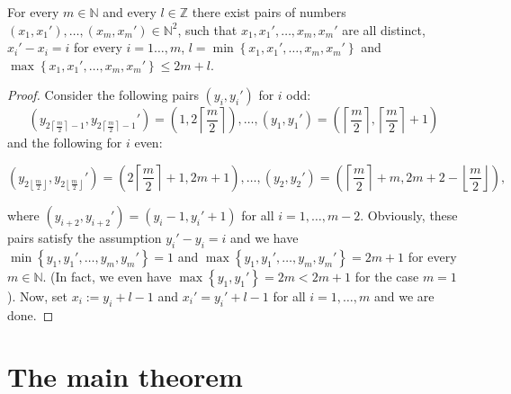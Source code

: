 \begin{lem}\label{lemma15}
For every \(m\in\mathbb{N}\) and every \(l\in\mathbb{Z}\) there exist pairs of numbers\\
\((x_1,x_1'),\ldots,(x_m,x_m')\in\mathbb{N}^2\), such that \(x_1,x_1',\ldots,x_m,x_m'\) are all distinct,\\
\(x_i'-x_i=i\) for every \(i=1\ldots,m\), \(l=\min\left\{x_1,x_1',\ldots,x_m,x_m'\right\}\) and\\
\(\max\left\{x_1,x_1',\ldots,x_m,x_m'\right\}\leq 2m+l\).
\begin{proof}
Consider the following pairs \((y_i,y_i')\) for \(i\) odd:
\[
\left(y_{2\left\lceil\frac{m}{2}\right\rceil-1},y_{2\left\lceil\frac{m}{2}\right\rceil-1}'\right)=\left(1,2\left\lceil\frac{m}{2}\right\rceil\right),\ldots,\left(y_1,y_1'\right)=\left(\left\lceil\frac{m}{2}\right\rceil,\left\lceil\frac{m}{2}\right\rceil+1\right)
\]
and the following for \(i\) even:
\begin{footnotesize}
\[
\left(y_{2\left\lfloor\frac{m}{2}\right\rfloor},y_{2\left\lfloor\frac{m}{2}\right\rfloor}'\right)=\left(2\left\lceil\frac{m}{2}\right\rceil+1,2m+1\right),\ldots,\left(y_2,y_2'\right)=\left(\left\lceil\frac{m}{2}\right\rceil+m,2m+2-\left\lfloor\frac{m}{2}\right\rfloor\right),
\]
\end{footnotesize}
where \((y_{i+2},y_{i+2}')=(y_i-1,y_i'+1)\) for all \(i=1,\ldots,m-2\). Obviously, these pairs satisfy the assumption \(y_i'-y_i=i\) and we have \(\min\left\{y_1,y_1',\ldots,y_m,y_m'\right\}=1\) and \(\max\left\{y_1,y_1',\ldots,y_m,y_m'\right\}=2m+1\) for every \(m\in\mathbb{N}\). (In fact, we even have \(\max\left\{y_1,y_1'\right\}=2m<2m+1\) for the case \(m=1\)). Now, set \(x_i:=y_i+l-1\) and \(x_i'=y_i'+l-1\) for all \(i=1,\ldots,m\) and we are done.
\end{proof}
\end{lem}

\section{The main theorem}

